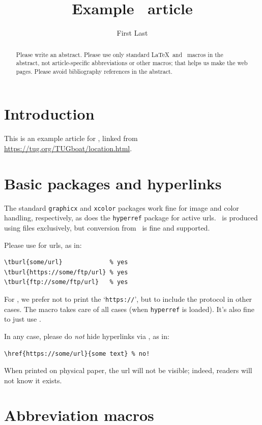 \documentclass{ltugboat}
\title{Example \TUB\ article}
\author{First Last}
\begin{document}
\maketitle

\begin{abstract}
Please write an abstract. Please use only standard \LaTeX\ and \TUB\
macros in the abstract, not article-specific abbreviations or other
macros; that helps us make the web pages. Please avoid bibliography
references in the abstract.
\end{abstract}

\section{Introduction}

This is an example article for \TUB, linked from
\url{https://tug.org/TUGboat/location.html}.

\section{Basic packages and hyperlinks}

The standard \texttt{graphicx} and \texttt{xcolor} packages work fine
for image and color handling, respectively, as does the
\texttt{hyperref} package for active urls. \TUB\ is produced using
\acro{PDF} files exclusively, but conversion from \DVI\ is fine and supported.

Please use  for urls, as in:
\begin{verbatim}
\tburl{some/url}             % yes
\tburl{https://some/ftp/url} % yes
\tburl{ftp://some/ftp/url}   % yes
\end{verbatim}
For \TUB, we prefer not to print the `\texttt{https://}', but to include
the protocol in other cases. The \cs{tburl} macro takes care of all
cases (when \texttt{hyperref} is loaded). It's also fine to just use
\cs{url}.

In any case, please do \emph{not} hide hyperlinks via , as in:
\begin{verbatim}
\href{https://some/url}{some text} % no!
\end{verbatim}
When printed on physical paper, the url will not be visible; indeed,
readers will not know it exists.

\section{Abbreviation macros}
\end{document}
